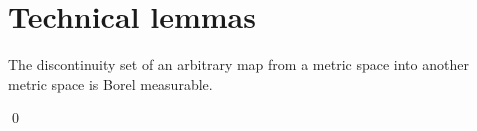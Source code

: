 

\section{Technical lemmas}
\setcounter{theorem}{0}
\setcounter{equation}{0}


\renewcommand{\theenumi}{\roman{enumi}}
\renewcommand{\labelenumi}{\textnormal{(\theenumi)}$\;\;$}


\begin{proposition}\label{DiscontinuitySetsAreBorel}
\mbox{} \vskip 0.1cm \noindent
The discontinuity set of an arbitrary map from a metric space into another metric space is Borel measurable.
\end{proposition}
\proof

\qed



